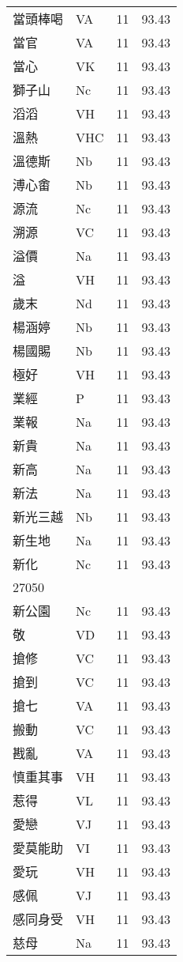 \documentclass[twocolumn]{book}
\begin{document}
\begin{supertabular}{llrr}
當頭棒喝 & VA & 11 &  93.43\\
當官 & VA & 11 &  93.43\\
當心 & VK & 11 &  93.43\\
獅子山 & Nc & 11 &  93.43\\
滔滔 & VH & 11 &  93.43\\
溫熱 & VHC & 11 &  93.43\\
溫德斯 & Nb & 11 &  93.43\\
溥心畬 & Nb & 11 &  93.43\\
源流 & Nc & 11 &  93.43\\
溯源 & VC & 11 &  93.43\\
溢價 & Na & 11 &  93.43\\
溢 & VH & 11 &  93.43\\
歲末 & Nd & 11 &  93.43\\
楊涵婷 & Nb & 11 &  93.43\\
楊國賜 & Nb & 11 &  93.43\\
極好 & VH & 11 &  93.43\\
業經 & P & 11 &  93.43\\
業報 & Na & 11 &  93.43\\
新貴 & Na & 11 &  93.43\\
新高 & Na & 11 &  93.43\\
新法 & Na & 11 &  93.43\\
新光三越 & Nb & 11 &  93.43\\
新生地 & Na & 11 &  93.43\\
新化 & Nc & 11 &  93.43\\
27050\\
新公園 & Nc & 11 &  93.43\\
敬 & VD & 11 &  93.43\\
搶修 & VC & 11 &  93.43\\
搶到 & VC & 11 &  93.43\\
搶七 & VA & 11 &  93.43\\
搬動 & VC & 11 &  93.43\\
戡亂 & VA & 11 &  93.43\\
慎重其事 & VH & 11 &  93.43\\
惹得 & VL & 11 &  93.43\\
愛戀 & VJ & 11 &  93.43\\
愛莫能助 & VI & 11 &  93.43\\
愛玩 & VH & 11 &  93.43\\
感佩 & VJ & 11 &  93.43\\
感同身受 & VH & 11 &  93.43\\
慈母 & Na & 11 &  93.43\\

\end{supertabular}
\end{document}

